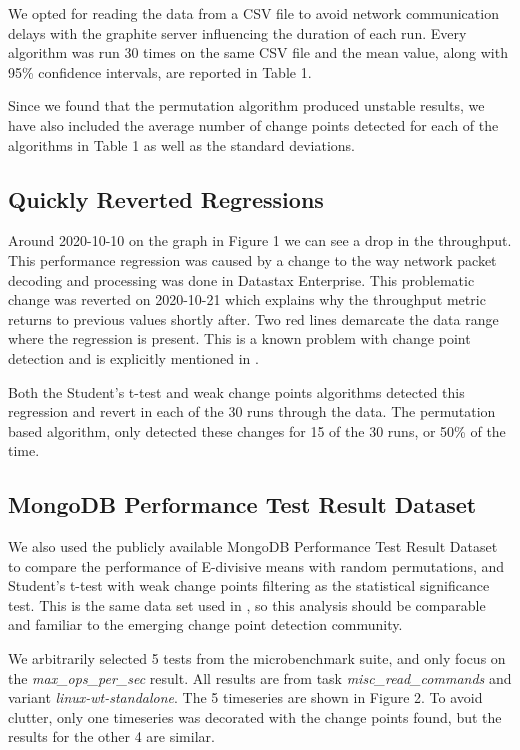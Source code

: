 \documentclass[sigconf]{acmart}
\begin{document}
We opted for reading the data from a CSV file to avoid network communication delays with the
graphite server influencing the duration of each run. Every algorithm was run 30 times on the same
CSV file and the mean value, along with 95\% confidence intervals, are reported in Table 1.

Since we found that the permutation algorithm produced unstable results, we have also included the average number of change points detected for each of the algorithms in Table 1 as well as the standard deviations.

\subsection{Quickly Reverted Regressions}
Around 2020-10-10 on the graph in Figure 1 we can see a drop in the throughput. This performance regression was caused by a change to the way network packet decoding and processing was done in Datastax Enterprise. This problematic change was reverted on 2020-10-21 which explains why the throughput metric returns to previous values shortly after. Two red lines demarcate the data range where the regression is present. This is a known problem with change point detection and is explicitly mentioned in \cite{MONGOCPD}.

Both the Student's t-test and weak change points algorithms detected this regression and revert in each of the 30
runs through the data. The permutation based algorithm, only detected these changes for 15 of the 30
runs, or 50\% of the time.

\subsection{MongoDB Performance Test Result Dataset}

We also used the publicly available MongoDB Performance Test Result Dataset \cite{MONGODATA} to
compare the performance of E-divisive means with random permutations, and Student's t-test with 
weak change points filtering as the statistical significance test. This is the same data set used in
\cite{MONGOCPD}, so this analysis should be comparable and familiar to the emerging change point
detection community.


We arbitrarily selected 5 tests from the microbenchmark suite, and only focus on the
\emph{max\_ops\_per\_sec} result. All results are from task \emph{misc\_read\_commands} and 
variant \emph{linux-wt-standalone}. The 5 timeseries are shown in Figure 2. To avoid clutter, only one
timeseries was decorated with the change points found, but the results for the other 4 are similar.
\end{document}
